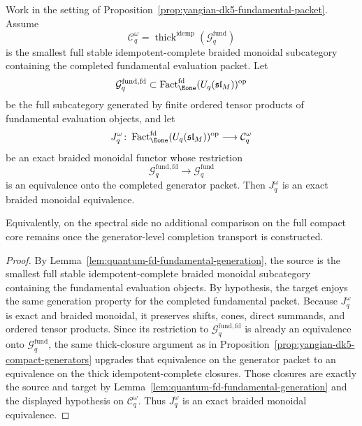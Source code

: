 \begin{proposition}
\label{prop:yangian-dk5-spectral-realization-formal}
Work in the setting of
Proposition~\ref{prop:yangian-dk5-fundamental-packet}.  Assume
\[
\mathcal{C}_q^\omega
=
\operatorname{thick}^{\mathrm{idemp}}(\mathcal{G}^{\mathrm{fund}}_{q})
\]
is the smallest full stable idempotent-complete braided monoidal
subcategory containing the completed fundamental evaluation packet.
Let
\[
\mathcal{G}^{\mathrm{fund,fd}}_{q}
\subset
\operatorname{Fact}_{\Eone}^{\mathrm{fd}}(U_q(\mathfrak{sl}_M))^{\mathrm{op}}
\]
be the full subcategory generated by finite ordered tensor products of
fundamental evaluation objects, and let
\[
J_q^\omega\colon
\operatorname{Fact}_{\Eone}^{\mathrm{fd}}(U_q(\mathfrak{sl}_M))^{\mathrm{op}}
\longrightarrow
\mathcal{C}_q^\omega
\]
be an exact braided monoidal functor whose restriction
\[
\mathcal{G}^{\mathrm{fund,fd}}_{q}
\longrightarrow
\mathcal{G}^{\mathrm{fund}}_{q}
\]
is an equivalence onto the completed generator packet.  Then
\(J_q^\omega\) is an exact braided monoidal equivalence.

Equivalently, on the spectral side no additional comparison on the full
compact core remains once the generator-level completion transport is
constructed.
\end{proposition}

\begin{proof}
By Lemma~\ref{lem:quantum-fd-fundamental-generation}, the source is the
smallest full stable idempotent-complete braided monoidal subcategory
containing the fundamental evaluation objects.  By hypothesis, the
target enjoys the same generation property for the completed
fundamental packet.  Because \(J_q^\omega\) is exact and braided
monoidal, it preserves shifts, cones, direct summands, and ordered
tensor products.  Since its restriction to
\(\mathcal{G}^{\mathrm{fund,fd}}_{q}\) is already an equivalence onto
\(\mathcal{G}^{\mathrm{fund}}_{q}\), the same thick-closure argument as
in Proposition~\ref{prop:yangian-dk5-compact-generators} upgrades that
equivalence on the generator packet to an equivalence on the thick
idempotent-complete closures.  Those closures are exactly the source
and target by Lemma~\ref{lem:quantum-fd-fundamental-generation} and the
displayed hypothesis on \(\mathcal{C}_q^\omega\).  Thus \(J_q^\omega\)
is an exact braided monoidal equivalence.
\end{proof}

